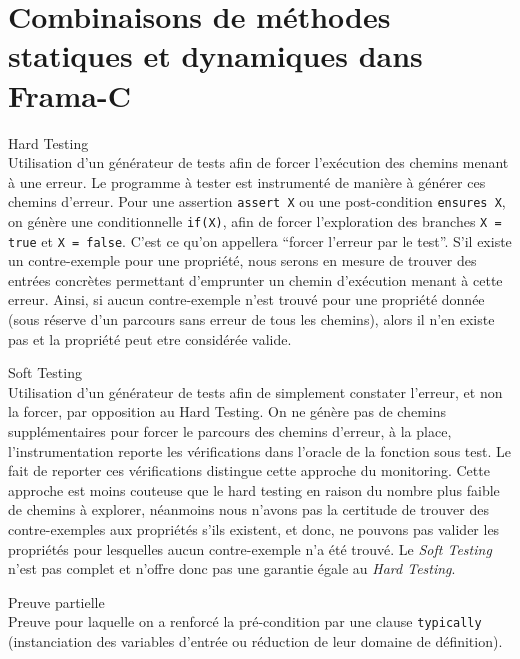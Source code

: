 
\chapter{Combinaisons de méthodes statiques et dynamiques dans Frama-C}

\begin{definition}{Hard Testing}\hfill \\
  Utilisation d'un générateur de tests afin de forcer l'exécution des chemins
  menant à une erreur. Le programme à tester est instrumenté de manière à
  générer ces chemins d'erreur. Pour une assertion \texttt{assert X} ou une
  post-condition \texttt{ensures X}, on génère
  une conditionnelle \texttt{if(X)}, afin de forcer l'exploration des branches
  \texttt{X = true} et \texttt{X = false}. C'est ce qu'on appellera ``forcer
  l'erreur par le test''. S'il existe un contre-exemple pour une propriété,
  nous serons en mesure de trouver des entrées concrètes permettant d'emprunter
  un chemin d'exécution menant à cette erreur. Ainsi, si aucun contre-exemple
  n'est trouvé pour une propriété donnée (sous réserve d'un parcours sans erreur
  de tous les chemins), alors il n'en existe pas et la propriété peut etre
  considérée valide.
\end{definition}

\begin{definition}{Soft Testing}\hfill \\
  Utilisation d'un générateur de tests afin de simplement constater l'erreur,
  et non la forcer, par opposition au Hard Testing.
  On ne génère pas de chemins supplémentaires pour forcer le parcours
  des chemins d'erreur, à la place, l'instrumentation reporte les vérifications
  dans l'oracle de la fonction sous test. Le fait de reporter ces vérifications
  distingue cette approche du monitoring. Cette approche est moins couteuse que
  le hard testing en raison du nombre plus faible de chemins à explorer,
  néanmoins nous n'avons pas la certitude de trouver des contre-exemples aux
  propriétés s'ils existent, et donc, ne pouvons pas valider les propriétés
  pour lesquelles aucun contre-exemple n'a été trouvé. Le {\em Soft Testing}
  n'est pas complet et n'offre donc pas une garantie égale au
  {\em Hard Testing}.
\end{definition}

\begin{definition}{Preuve partielle}\hfill \\
  Preuve pour laquelle on a renforcé la pré-condition par une clause
  \texttt{typically} (instanciation des variables d'entrée ou réduction de leur
  domaine de définition).
\end{definition}

